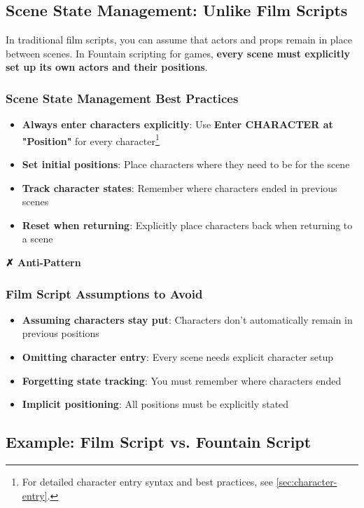 \documentclass[11pt,letterpaper,oldstylefigures]{memoir}
\newenvironment{AntiPattern}
{\begingroup
\small
\setlength{\parindent}{0pt}
\setlength{\parskip}{0.5em}
\allowdisplaybreaks
\setlength{\displaywidowpenalty}{0}
\setlength{\widowpenalty}{0}
\setlength{\clubpenalty}{0}
\setlength{\interlinepenalty}{0}
\begin{tcolorbox}[
    colback=red!5,
    colframe=red!75!black,
    boxrule=0.5pt,
    arc=2pt,
    left=0.5em,
    right=0.5em,
    top=0.25em,
    bottom=0.25em
]
\textbf{✗ Anti-Pattern}
\end{tcolorbox}\par
}
{\endgroup}
\newcommand{\fountain}[1]{\textbf{#1}}
\begin{document}
\subsection{Scene State Management: Unlike Film Scripts}

In traditional film scripts, you can assume that actors and props remain in place between scenes. In Fountain scripting for games, \textbf{every scene must explicitly set up its own actors and their positions}.

\subsubsection{Scene State Management Best Practices}
\begin{itemize}
\item \textbf{Always enter characters explicitly}: Use \fountain{Enter CHARACTER at "Position"} for every character\footnote{For detailed character entry syntax and best practices, see \autoref{sec:character-entry}.}
\item \textbf{Set initial positions}: Place characters where they need to be for the scene
\item \textbf{Track character states}: Remember where characters ended in previous scenes
\item \textbf{Reset when returning}: Explicitly place characters back when returning to a scene
\end{itemize}


\begin{AntiPattern}
\subsubsection{Film Script Assumptions to Avoid}
\begin{itemize}
\item \textbf{Assuming characters stay put}: Characters don't automatically remain in previous positions
\item \textbf{Omitting character entry}: Every scene needs explicit character setup
\item \textbf{Forgetting state tracking}: You must remember where characters ended
\item \textbf{Implicit positioning}: All positions must be explicitly stated
\end{itemize}
\end{AntiPattern}

\subsection{Example: Film Script vs. Fountain Script}
\end{document}
